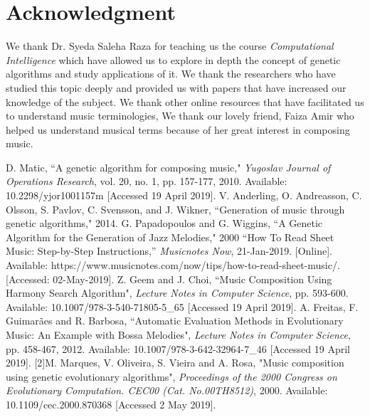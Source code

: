 \documentclass[conference]{IEEEtran}
\begin{document}
\section*{Acknowledgment}
We thank Dr. Syeda Saleha Raza for teaching us the course \textit{Computational Intelligence} which have allowed us to explore in depth the concept of genetic algorithms and study applications of it. We thank the researchers who have studied this topic deeply and provided us with papers that have increased our knowledge of the subject. We thank other online resources that have facilitated us to understand music terminologies, We thank our lovely friend, Faiza Amir who helped us understand musical terms because of her great interest in composing music.


\begin{thebibliography}{00}
 D. Matic, ``A genetic algorithm for composing music," \textit{Yugoslav Journal of Operations Research}, vol. 20, no. 1, pp. 157-177, 2010. Available: 10.2298/yjor1001157m [Accessed 19 April 2019].
V. Anderling, O. Andreasson, C. Olsson, S. Pavlov, C. Svensson, and J. Wikner, ``Generation of music through genetic algorithms," 2014.
G. Papadopoulos and G. Wiggins, ``A Genetic Algorithm for the Generation of Jazz Melodies," 2000
“How To Read Sheet Music: Step-by-Step Instructions,” \textit{Musicnotes Now}, 21-Jan-2019. [Online]. Available: https://www.musicnotes.com/now/tips/how-to-read-sheet-music/. [Accessed: 02-May-2019].
 Z. Geem and J. Choi, ``Music Composition Using Harmony Search Algorithm", \textit{Lecture Notes in Computer Science}, pp. 593-600. Available: 10.1007/978-3-540-71805-5\_65 [Accessed 19 April 2019].
 A. Freitas, F. Guimarães and R. Barbosa, ``Automatic Evaluation Methods in Evolutionary Music: An Example with Bossa Melodies", \textit{Lecture Notes in Computer Science}, pp. 458-467, 2012. Available: 10.1007/978-3-642-32964-7\_46 [Accessed 19 April 2019].
[2]M. Marques, V. Oliveira, S. Vieira and A. Rosa, "Music composition using genetic evolutionary algorithms", \textit{Proceedings of the 2000 Congress on Evolutionary Computation. CEC00 (Cat. No.00TH8512)}, 2000. Available: 10.1109/cec.2000.870368 [Accessed 2 May 2019].
\end{thebibliography}
\end{document}
